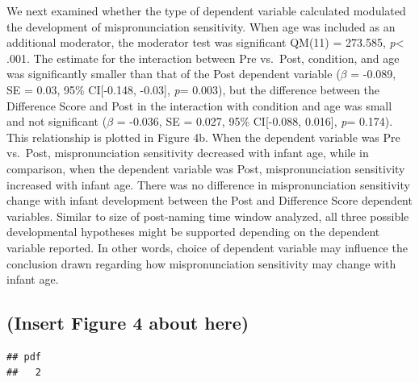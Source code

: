 \documentclass[man]{apa6}
\theoremstyle{definition}
\theoremstyle{definition}
\theoremstyle{definition}
\theoremstyle{remark}
\begin{document}
We next examined whether the type of dependent variable calculated
modulated the development of mispronunciation sensitivity. When age was
included as an additional moderator, the moderator test was significant
QM(11) = 273.585, \emph{p}\textless{} .001. The estimate for the
interaction between Pre vs.~Post, condition, and age was significantly
smaller than that of the Post dependent variable (\(\beta\) = -0.089, SE
= 0.03, 95\% CI{[}-0.148, -0.03{]}, \emph{p}= 0.003), but the difference
between the Difference Score and Post in the interaction with condition
and age was small and not significant (\(\beta\) = -0.036, SE = 0.027,
95\% CI{[}-0.088, 0.016{]}, \emph{p}= 0.174). This relationship is
plotted in Figure 4b. When the dependent variable was Pre vs.~Post,
mispronunciation sensitivity decreased with infant age, while in
comparison, when the dependent variable was Post, mispronunciation
sensitivity increased with infant age. There was no difference in
mispronunciation sensitivity change with infant development between the
Post and Difference Score dependent variables. Similar to size of
post-naming time window analyzed, all three possible developmental
hypotheses might be supported depending on the dependent variable
reported. In other words, choice of dependent variable may influence the
conclusion drawn regarding how mispronunciation sensitivity may change
with infant age.

\subsection{(Insert Figure 4 about
here)}\label{insert-figure-4-about-here}

\begin{verbatim}
## pdf 
##   2
\end{verbatim}
\end{document}
